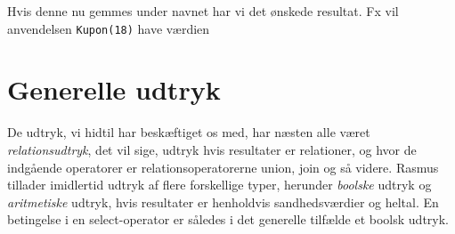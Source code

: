 
Hvis denne nu gemmes under navnet  har vi det
\o{}nskede resultat. Fx vil anvendelsen \verb"Kupon(18)" have
v\ae{}rdien
\begin{center}
\end{center}

\newpage
\section{Generelle udtryk}
De udtryk, vi hidtil har besk\ae{}ftiget os med, har n\ae{}sten alle
v\ae{}ret {\em relationsudtryk}, det vil sige, udtryk hvis resultater er
relationer, og hvor de indg\aa{}ende operatorer er relationsoperatorerne
union, join og s\aa{} videre. {\sc Rasmus} tillader imidlertid udtryk af
flere forskellige typer, herunder {\em boolske\/} udtryk og
{\em aritmetiske\/} udtryk, hvis resultater er henholdvis
sandhedsv\ae{}rdier og heltal. En betingelse i en select-operator er
s\aa{}ledes i det generelle tilf\ae{}lde et boolsk udtryk. 


